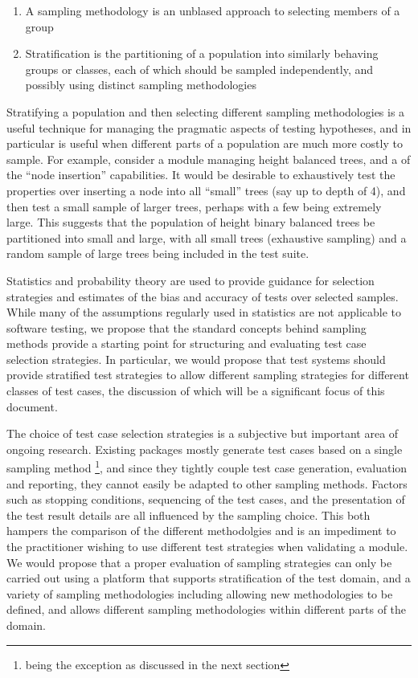\begin{enumerate}
\item A sampling methodology is an unblased approach to selecting members of a group
\item Stratification is the partitioning of a population into similarly behaving groups or classes,
each of which should be sampled independently, and possibly using distinct sampling methodologies
\end{enumerate}

\noindent
Stratifying a population and then selecting different sampling methodologies
is a useful technique for managing the pragmatic aspects of testing hypotheses,
and in particular is useful when different parts of a population are much more costly to sample.
For example, consider a module managing height balanced trees,
and a \pbt of the ``node insertion'' capabilities.
It would be desirable to exhaustively test the properties 
over inserting a node into all ``small'' trees (say up to depth of 4),
and then test a small sample of larger trees, perhaps with a few being extremely large.
This suggests that the population of height binary balanced trees be partitioned into small and large,
with all small trees (exhaustive sampling) and a random sample of large trees
being included in the test suite.

Statistics and probability theory are used to provide 
guidance for selection strategies and 
estimates of the bias and accuracy of tests over selected samples.
While many of the assumptions regularly used in statistics 
are not applicable to software testing,
we propose that the standard concepts behind sampling methods 
provide a starting point for structuring and evaluating test case selection strategies.
In particular, we would propose that test systems should provide
stratified test strategies to allow different sampling strategies for different classes of test cases,
the discussion of which will be a significant focus of this document.

The choice of test case selection strategies is 
a subjective but important area of ongoing research.
Existing \pbt packages mostly generate test cases based on a single sampling method
\footnote{\FEAT being the exception as discussed in the next section},
and since they tightly couple test case generation, evaluation and reporting,
they cannot easily be adapted to other sampling methods.
Factors such as stopping conditions,
sequencing of the test cases,
and the presentation of the test result details
are all influenced by the sampling choice.
This both hampers the comparison of the different methodolgies
and is an impediment to the practitioner wishing to use different test strategies
when validating a module.
We would propose that a proper evaluation of sampling strategies can only be carried out
using a platform that supports stratification of the test domain,
and a variety of sampling methodologies including allowing new methodologies to be defined,
and allows different sampling methodologies within different parts of the domain.

